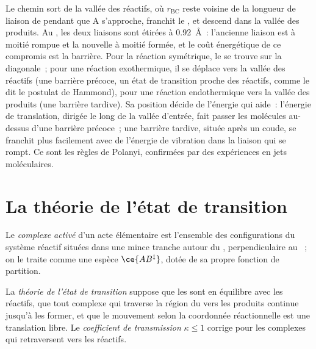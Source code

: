 Le chemin sort de la vallée des réactifs, où $r_{\mathrm{BC}}$ reste
voisine de la longueur de liaison de  pendant que A s'approche,
franchit le , et descend dans la vallée des produits. Au , les deux liaisons sont étirées à \qty{0.92}{\angstrom}~:
l'ancienne liaison est à moitié rompue et la nouvelle à moitié formée,
et le coût énergétique de ce compromis est la barrière. Pour la réaction
symétrique, le  se trouve sur la diagonale~; pour une
réaction exothermique, il se déplace vers la vallée des réactifs (une
barrière précoce, un état de transition proche des réactifs, comme le dit
le postulat de Hammond), pour une réaction endothermique vers la vallée
des produits (une barrière tardive). Sa position décide de l'énergie qui
aide~: l'énergie de translation, dirigée le long de la vallée d'entrée,
fait passer les molécules au-dessus d'une barrière précoce~; une
barrière tardive, située après un coude, se franchit plus facilement
avec de l'énergie de vibration dans la liaison qui se rompt. Ce sont les
règles de Polanyi, confirmées par des expériences en jets moléculaires.

\section{La théorie de l'état de transition}

\begin{definition}\label{def:b3:rate-theories:activated-complex}
Le \emph{complexe activé} d'un
acte élémentaire est l'ensemble des configurations du système réactif
situées dans une mince tranche autour du , perpendiculaire au
~; on le traite comme une espèce
$\ce{AB^{\ddagger}}$, dotée de sa propre fonction de partition.
\end{definition}

\begin{definition}\label{def:b3:rate-theories:tst}
La \emph{théorie de l'état de transition} suppose
que les  sont en équilibre avec les réactifs, que tout
complexe qui traverse la région du  vers les produits
continue jusqu'à les former, et que le mouvement selon la coordonnée
réactionnelle est une translation libre. Le
\emph{coefficient de transmission} $\kappa \le 1$
corrige pour les complexes qui retraversent vers les réactifs.
\end{definition}

